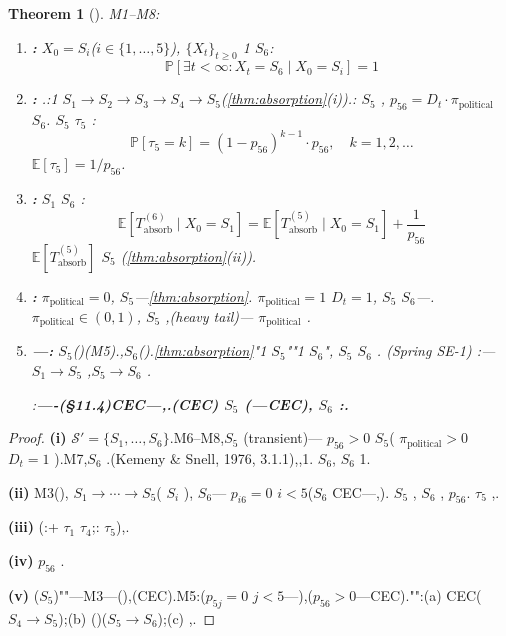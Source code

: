 \documentclass[12pt,a4paper]{article}
\newtheorem{theorem}{Theorem}[section]
\theoremstyle{definition}
\theoremstyle{remark}
\begin{document}
\begin{theorem}[]
\label{thm:universal-harmony-absorption}
M1--M8:

\begin{enumerate}[label=(\roman*), itemsep=6pt]
\item \textbf{:}  $X_0 = S_i$($i \in \{1, \ldots, 5\}$), $\{X_t\}_{t \geq 0}$ 1 $S_6$:
\begin{equation}
\mathbb{P}\left[\exists t < \infty : X_t = S_6 \mid X_0 = S_i\right] = 1
\end{equation}

\item \textbf{:} .:1 $S_1 \to S_2 \to S_3 \to S_4 \to S_5$(\ref{thm:absorption}(i)).: $S_5$ , $p_{56} = D_t \cdot \pi_{\text{political}}$  $S_6$. $S_5$  $\tau_5$ :
\begin{equation}
\mathbb{P}[\tau_5 = k] = (1 - p_{56})^{k-1} \cdot p_{56}, \quad k = 1, 2, \ldots
\end{equation}
 $\mathbb{E}[\tau_5] = 1 / p_{56}$.

\item \textbf{:}  $S_1$  $S_6$ :
\begin{equation}
\mathbb{E}[T_{\text{absorb}}^{(6)} \mid X_0 = S_1] = \mathbb{E}[T_{\text{absorb}}^{(5)} \mid X_0 = S_1] + \frac{1}{p_{56}}
\end{equation}
 $\mathbb{E}[T_{\text{absorb}}^{(5)}]$  $S_5$ (\ref{thm:absorption}(ii)).

\item \textbf{:}  $\pi_{\text{political}} = 0$, $S_5$---\ref{thm:absorption}. $\pi_{\text{political}} = 1$  $D_t = 1$, $S_5$  $S_6$---. $\pi_{\text{political}} \in (0, 1)$, $S_5$ ,(heavy tail)--- $\pi_{\text{political}}$ .

\item \textbf{---:}  $S_5$()(M5)\textit{}.,$S_6$().\ref{thm:absorption}"1 $S_5$""1 $S_6$", $S_5$  $S_6$ .  (Spring SE-1) :---$S_1 \to S_5$ ,$S_5 \to S_6$ .

:\textbf{----(§11.4)CEC---,.(CEC) $S_5$ (---CEC), $S_6$ :.}
\end{enumerate}
\end{theorem}

\begin{proof}
\textbf{(i)}  $\mathcal{S}' = \{S_1, \ldots, S_6\}$.M6--M8,$S_5$ (transient)--- $p_{56} > 0$  $S_5$( $\pi_{\text{political}} > 0$  $D_t = 1$ ).M7,$S_6$ .(Kemeny \& Snell, 1976, 3.1.1),,1. $S_6$, $S_6$ 1.

\textbf{(ii)} M3(), $S_1 \to \cdots \to S_5$( $S_i$ ), $S_6$--- $p_{i6} = 0$  $i < 5$($S_6$ CEC---,). $S_5$ , $S_6$ , $p_{56}$. $\tau_5$ ,.

\textbf{(iii)} (:+ $\tau_1$  $\tau_4$;: $\tau_5$),.

\textbf{(iv)}  $p_{56}$ .

\textbf{(v)} ($S_5$)""---M3---\textit{}(),\textit{}(CEC).M5:($p_{5j} = 0$  $j < 5$---),($p_{56} > 0$---CEC)."":(a) CEC($S_4 \to S_5$);(b) ()($S_5 \to S_6$);(c) ,.
\end{proof}
\end{document}
